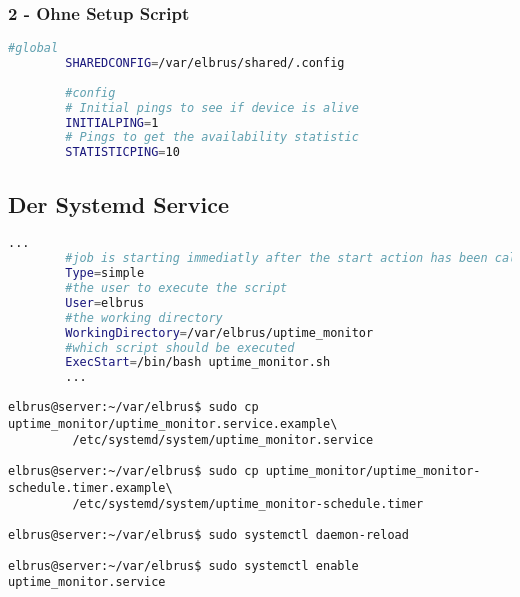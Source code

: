 \documentclass{article}
\begin{document}
	\subsubsection{2 - Ohne Setup Script}
	\lstset{style=files}
	\begin{lstlisting}[caption={Anhand von '.env.example' eigene '.env' Datei anlegen.}, language=bash]
		#global
		SHAREDCONFIG=/var/elbrus/shared/.config
		
		#config
		# Initial pings to see if device is alive
		INITIALPING=1
		# Pings to get the availability statistic
		STATISTICPING=10
	\end{lstlisting}

	\newpage
	\subsection[systemd service]{Der Systemd Service}
	\lstset{style=files}
	\begin{lstlisting}[caption={uptime\_monitor.service.example - Die Variable 'WorkingDirectory' sowie die Variable 'User' anpassen.},language=bash ,keywords={WorkingDirectory, User}, keywordstyle=\color{red}, firstnumber=5]
		...
		#job is starting immediatly after the start action has been called
		Type=simple
		#the user to execute the script
		User=elbrus
		#the working directory
		WorkingDirectory=/var/elbrus/uptime_monitor
		#which script should be executed
		ExecStart=/bin/bash uptime_monitor.sh
		...
	\end{lstlisting}
	
	\lstset{style=commands}
	\begin{lstlisting}[caption={Kopieren des Serviceprogrammes.}]
		elbrus@server:~/var/elbrus$ sudo cp uptime_monitor/uptime_monitor.service.example\
		 /etc/systemd/system/uptime_monitor.service
	\end{lstlisting}
	
	\begin{lstlisting}[caption={Kopieren des Zeitplanungsprogrammes.}]
		elbrus@server:~/var/elbrus$ sudo cp uptime_monitor/uptime_monitor-schedule.timer.example\
		 /etc/systemd/system/uptime_monitor-schedule.timer
	\end{lstlisting}
	
	\begin{lstlisting}[caption={Neuladen des 'systemctl' Deamons.}]
		elbrus@server:~/var/elbrus$ sudo systemctl daemon-reload
	\end{lstlisting}
	
	\begin{lstlisting}[caption={Aktivieren des Serviceprogrammes.}]
		elbrus@server:~/var/elbrus$ sudo systemctl enable uptime_monitor.service
	\end{lstlisting}
	
\end{document}
